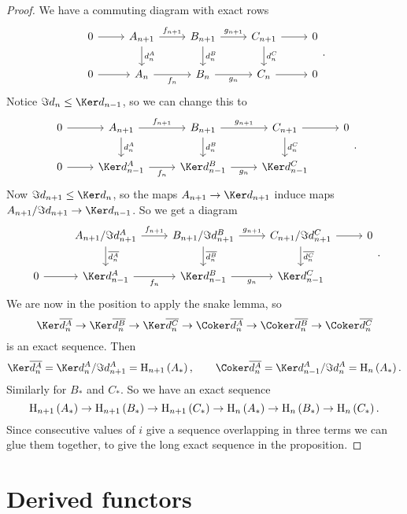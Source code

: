 \begin{proof}
We have a commuting diagram with exact rows
$$
\begin{tikzcd}
0 \arrow{r} & A_{n + 1} \arrow{r}{f_{n + 1}} \arrow{d}{d_n^A} & B_{n + 1} \arrow{r}{g_{n + 1}} \arrow{d}{d_n^B} & C_{n + 1} \arrow{r} \arrow{d}{d_n^C} & 0 \\
0 \arrow{r} & A_n \arrow[swap]{r}{f_n} & B_n \arrow[swap]{r}{g_n} & C_n \arrow{r} & 0
\end{tikzcd}.
$$
Notice $ \Im d_n \le \Ker d_{n - 1} $, so we can change this to
$$
\begin{tikzcd}
0 \arrow{r} & A_{n + 1} \arrow{r}{f_{n + 1}} \arrow{d}{d_n^A} & B_{n + 1} \arrow{r}{g_{n + 1}} \arrow{d}{d_n^B} & C_{n + 1} \arrow{r} \arrow{d}{d_n^C} & 0 \\
0 \arrow{r} & \Ker d_{n - 1}^A \arrow[swap]{r}{f_n} & \Ker d_{n - 1}^B \arrow[swap]{r}{g_n} & \Ker d_{n - 1}^C &
\end{tikzcd}.
$$
Now $ \Im d_{n + 1} \le \Ker d_n $, so the maps $ A_{n + 1} \to \Ker d_{n + 1} $ induce maps $ A_{n + 1} / \Im d_{n + 1} \to \Ker d_{n - 1} $. So we get a diagram
$$
\begin{tikzcd}
& A_{n + 1} / \Im d_{n + 1}^A \arrow{r}{f_{n + 1}} \arrow{d}{\overline{d_n^A}} & B_{n + 1} / \Im d_{n + 1}^B \arrow{r}{g_{n + 1}} \arrow{d}{\overline{d_n^B}} & C_{n + 1} / \Im d_{n + 1}^C \arrow{r} \arrow{d}{\overline{d_n^C}} & 0 \\
0 \arrow{r} & \Ker d_{n - 1}^A \arrow[swap]{r}{f_n} & \Ker d_{n - 1}^B \arrow[swap]{r}{g_n} & \Ker d_{n - 1}^C &
\end{tikzcd}.
$$
We are now in the position to apply the snake lemma, so
$$ \Ker \overline{d_n^A} \to \Ker \overline{d_n^B} \to \Ker \overline{d_n^C} \to \Coker \overline{d_n^A} \to \Coker \overline{d_n^B} \to \Coker \overline{d_n^C} $$
is an exact sequence. Then
$$ \Ker \overline{d_n^A} = \Ker d_n^A / \Im d_{n + 1}^A = \H_{n + 1}\br{A_*}, \qquad \Coker \overline{d_n^A} = \Ker d_{n - 1}^A / \Im d_n^A = \H_n\br{A_*}. $$
Similarly for $ B_* $ and $ C_* $. So we have an exact sequence
$$ \H_{n + 1}\br{A_*} \to \H_{n + 1}\br{B_*} \to \H_{n + 1}\br{C_*} \to \H_n\br{A_*} \to \H_n\br{B_*} \to \H_n\br{C_*}. $$
Since consecutive values of $ i $ give a sequence overlapping in three terms we can glue them together, to give the long exact sequence in the proposition.
\end{proof}

\pagebreak

\section{Derived functors}

